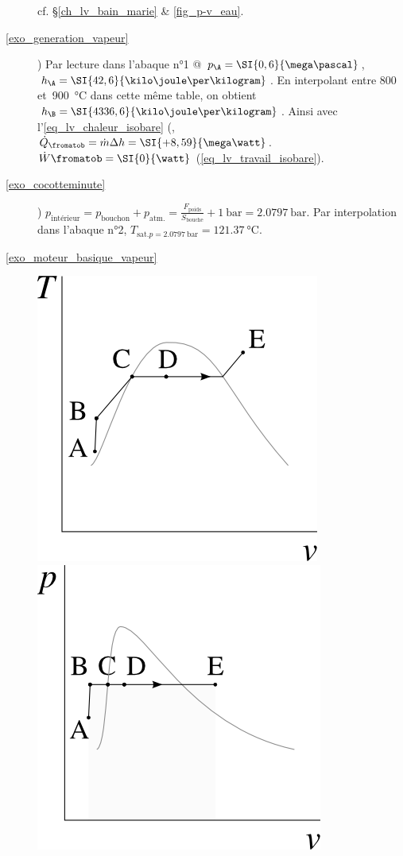\begin{description}
			\tab cf. \S\ref{ch_lv_bain_marie} \& \cref{fig_p-v_eau}.
	\item [\ref{exo_generation_vapeur}]
			) Par lecture dans l’abaque n°1 @ $p_\A = \SI{0,6}{\mega\pascal}$, $h_\A = \SI{42,6}{\kilo\joule\per\kilogram}$. En interpolant entre \num{800} et~\SI{900}{\degreeCelsius} dans cette même table, on obtient $h_\B = \SI{4336,6}{\kilo\joule\per\kilogram}$. Ainsi avec l’\cref{eq_lv_chaleur_isobare} (, $\dot{Q}_\fromatob = \dot m \Delta h = \SI{+8,59}{\mega\watt}$. $\dot{W}\fromatob = \SI{0}{\watt}$ (\ref{eq_lv_travail_isobare}).
	\item [\ref{exo_cocotteminute}]
			) $p_\text{intérieur} = p_\text{bouchon} + p_\text{atm.} = \frac{F_\text{poids}}{S_\text{bouche}} + \SI{1}{\bar} = \SI{2,0797}{\bar}$. Par interpolation dans l’abaque n°2, $T_{\text{sat.} p=\SI{2,0797}{\bar}} = \SI{121,37}{\degreeCelsius}$.
	\item [\ref{exo_moteur_basique_vapeur}]
			\includegraphics[width=\solutiondiagramwidth]{images/exo_sol_tv_moteur_basique_1.png}
			\includegraphics[width=\solutiondiagramwidth]{images/exo_sol_pv_moteur_basique_2.png}

\end{description}
